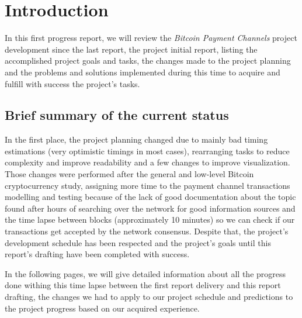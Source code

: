 \chapter*{Introduction}
\label{chap:introduction}

In this first progress report, we will review the \textit{Bitcoin Payment Channels} project development since the last report, the project initial report, listing the accomplished project goals and tasks, the changes made to the project planning and the problems and solutions implemented during this time to acquire and fulfill with success the project's tasks.

\section{Brief summary of the current status}
In the first place, the project planning changed due to mainly bad timing estimations (very optimistic timings in most cases), rearranging tasks to reduce complexity and improve readability and a few changes to improve visualization. Those changes were performed after the general and low-level Bitcoin cryptocurrency study, assigning more time to the payment channel transactions modelling and testing because of the lack of good documentation about the topic found after hours of searching over the network for good information sources and the time lapse between blocks (approximately 10 minutes\cite{tbtc_blockr_io_charts:online}) so we can check if our transactions get accepted by the network consensus. Despite that, the project's development schedule has been respected and the project's goals until this report's drafting have been completed with success. 

In the following pages, we will give detailed information about all the progress done withing this time lapse between the first report delivery and this report drafting, the changes we had to apply to our project schedule and predictions to the project progress based on our acquired experience.